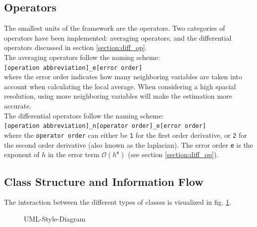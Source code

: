\subsection{Operators}
The smallest units of the framework are the operators.
Two categories of operators have been implemented: averaging operators, and the differential operators discussed in section \ref{section:diff_op}.\\
The averaging operators follow the naming scheme:
\\
\texttt{[operation abbreviation]\_e[error order]}
\\
where the error order indicates how many neighboring variables are taken into account when calculating the local average.
When considering a high spacial resolution, using more neighboring variables will make the estimation more accurate.
\\
The differential operators follow the naming scheme:
\\
\texttt{[operation abbreviation]\_n[operator order]\_e[error order]}
\\ 
where the \texttt{operator order} can either be \texttt{1} for the first order derivative, or \texttt{2} for the second order derivative (also known as the laplacian).
The error order \texttt{e} is the exponent of $h$ in the error term $\mathcal{O}(h^\texttt{e})$ (see section \ref{section:diff_op}).

\subsection{Class Structure and Information Flow}
The interaction between the different types of classes is visualized in fig. \ref{UML_diagram}.

\begin{figure}[!h]
    \caption{UML-Style-Diagram}
    \label{UML_diagram}
\end{figure}

